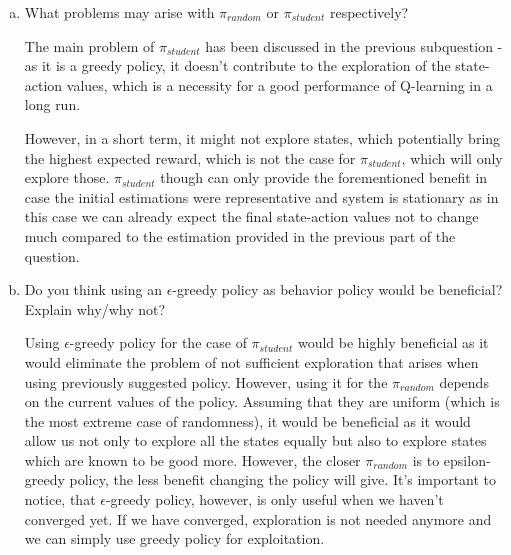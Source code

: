 \documentclass{exam}
\begin{document}
\begin{problem}
\begin{enumerate}
\begin{enumerate}[(a)]
\begin{solutionorlines}[2in]
        \end{solutionorlines}
        \item What problems may arise with $\pi_{random}$ or $\pi_{student}$ respectively?
        \begin{solutionorlines}[2in]
        The main problem of $\pi_{student}$ has been discussed in the previous subquestion - as it is a greedy policy, it doesn't contribute to the exploration of the state-action values, which is a necessity for a good performance of Q-learning in a long run. 
        
        However, in a short term, it might not explore states, which potentially bring the highest expected reward, which is not the case for $\pi_{student}$, which will only explore those. $\pi_{student}$ though can only provide the forementioned benefit in case the initial estimations were representative and system is stationary as in this case we can already expect the final state-action values not to change much compared to the estimation provided in the previous part of the question.
        \end{solutionorlines}
        \item Do you think using an $\epsilon$-greedy policy as behavior policy would be beneﬁcial? Explain why/why not?
        \begin{solutionorlines}[2in]
        Using $\epsilon$-greedy policy for the case of $\pi_{student}$ would be highly beneficial as it would eliminate the problem of not sufficient exploration that arises when using previously suggested policy. However, using it for the $\pi_{random}$ depends on the current values of the policy. Assuming that they are uniform (which is the most extreme case of randomness), it would be beneficial as it would allow us not only to explore all the states equally but also to explore states which are known to be good more. However, the closer $\pi_{random}$ is to epsilon-greedy policy, the less benefit changing the policy will give.
        It's important to notice, that $\epsilon$-greedy policy, however, is only useful when we haven't converged yet. If we have converged, exploration is not needed anymore and we can simply use greedy policy for exploitation.
        \end{solutionorlines}
    \end{enumerate}
\end{enumerate}
\end{problem}

\end{document}
